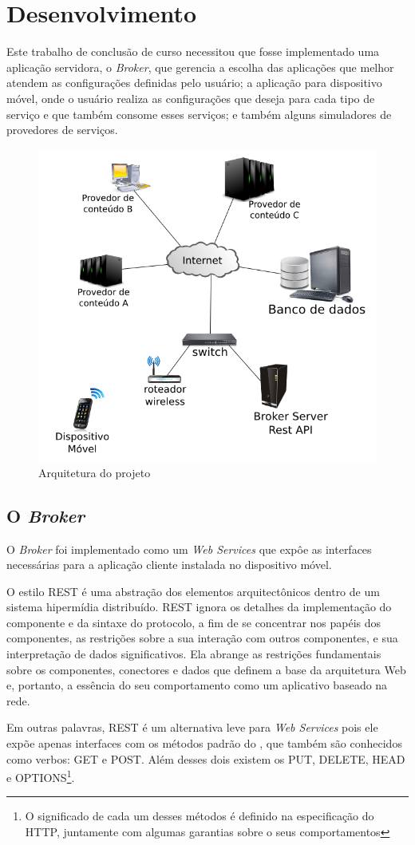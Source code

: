\chapter{Desenvolvimento}
Este trabalho de conclusão de curso necessitou que fosse implementado uma aplicação servidora, o \textit{Broker}, que gerencia a escolha das aplicações que melhor atendem as configurações definidas pelo usuário; a aplicação para dispositivo móvel, onde o usuário realiza as configurações que deseja para cada tipo de serviço e que também consome esses serviços; e também alguns simuladores de provedores de serviços.

\begin{figure}[!htb]
  \centering
  \includegraphics[width=.7\textwidth]{arquitetura.png} %
  \caption[Arquitetura do projeto]{Arquitetura do projeto}
  \label{fig:arquitetura}
\end{figure}

\section{O \normalfont\itshape Broker}
O \textit{Broker} foi implementado como um \textit{Web Services}  que expôe as interfaces necessárias para a aplicação cliente instalada no dispositivo móvel.
\begin{citacao}
O estilo REST é uma abstração dos elementos arquitectônicos dentro de um sistema hipermídia distribuído. REST ignora os detalhes da implementação do componente e da sintaxe do protocolo, a fim de se concentrar nos papéis dos componentes, as restrições sobre a sua interação com outros componentes, e sua interpretação de dados significativos. Ela abrange as restrições fundamentais sobre os componentes, conectores e dados que definem a base da arquitetura Web e, portanto, a essência do seu comportamento como um aplicativo baseado na rede. \cite{fielding2000architectural}
\end{citacao}
Em outras palavras, REST é um alternativa leve para \textit{Web Services} pois ele expõe apenas interfaces com os métodos padrão do , que também são conhecidos como verbos: GET e POST. Além desses dois existem os PUT, DELETE, HEAD e OPTIONS\footnote{O significado de cada um desses métodos é definido na especificação do HTTP, juntamente com algumas garantias sobre o seus comportamentos}.

